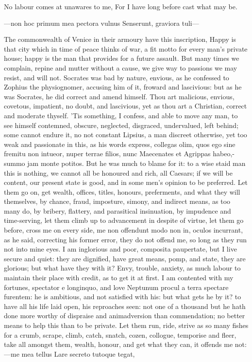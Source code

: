 {No labour comes at unawares to me,
For I have long before cast what may be.

---non hoc primum mea pectora vulnus
Senserunt, graviora tuli---

The commonwealth of Venice in their armoury have this
inscription, Happy is that city which in time of peace thinks of war, a
fit motto for every man's private house; happy is the man that provides
for a future assault. But many times we complain, repine and mutter
without a cause, we give way to passions we may resist, and will not.
Socrates was bad by nature, envious, as he confessed to Zophius the
physiognomer, accusing him of it, froward and lascivious: but as he was
Socrates, he did correct and amend himself. Thou art malicious,
envious, covetous, impatient, no doubt, and lascivious, yet as thou art
a Christian, correct and moderate thyself. 'Tis something, I confess,
and able to move any man, to see himself contemned, obscure, neglected,
disgraced, undervalued, left behind; some cannot endure it, no
not constant Lipsius, a man discreet otherwise, yet too weak and
passionate in this, as his words express, collegas olim, quos ego
sine fremitu non intueor, nuper terrae filios, nunc Maecenates et
Agrippas habeo,-summo jam monte potitos. But he was much to blame for
it: to a wise staid man this is nothing, we cannot all be honoured and
rich, all Caesars; if we will be content, our present state is good,
and in some men's opinion to be preferred. Let them go on, get wealth,
offices, titles, honours, preferments, and what they will themselves,
by chance, fraud, imposture, simony, and indirect means, as too many
do, by bribery, flattery, and parasitical insinuation, by impudence and
time-serving, let them climb up to advancement in despite of virtue,
let them go before, cross me on every side, me non offendunt modo non
in, oculos incurrant, as he said, correcting his former error,
they do not offend me, so long as they run not into mine eyes. I am
inglorious and poor, composita paupertate, but I live secure and quiet:
they are dignified, have great means, pomp, and state, they are
glorious; but what have they with it? Envy, trouble, anxiety, as
much labour to maintain their place with credit, as to get it at first.
I am contented with my fortunes, spectator e longinquo, and love
Neptunum procul a terra spectare furentem: he is ambitious, and not
satisfied with his: but what gets he by it? to have all his life
laid open, his reproaches seen: not one of a thousand but he hath done
more worthy of dispraise and animadversion than commendation; no better
means to help this than to be private. Let them run, ride, strive as so
many fishes for a crumb, scrape, climb, catch, snatch, cozen, collogue,
temporise and fleer, take all amongst them, wealth, honour, and
get what they can, it offends me not:
---me mea tellus
Lare secreto tutoque tegat,

}
